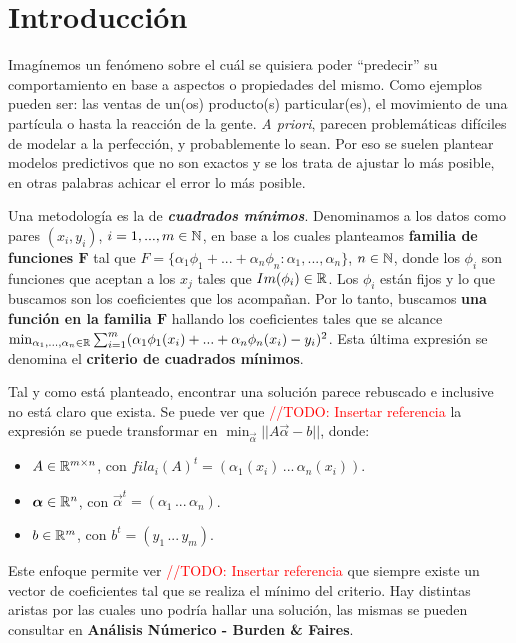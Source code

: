\section{Introducci\'on}\label{intro}

Imag\'inemos un fen\'omeno sobre el cu\'al se quisiera poder ``predecir'' su comportamiento en base a aspectos o propiedades del mismo. Como ejemplos pueden ser: las ventas de un(os) producto(s) particular(es), el movimiento de una part\'icula o hasta la reacci\'on de la gente. \textit{A priori}, parecen problem\'aticas dif\'iciles de modelar a la perfecci\'on, y probablemente lo sean. Por eso se suelen plantear modelos predictivos que no son exactos y se los trata de ajustar lo m\'as posible, en otras palabras achicar el error lo m\'as posible.

Una metodolog\'ia es la de \textbf{\textit{cuadrados m\'inimos}}. Denominamos a los datos como pares $(x_i, y_i)$, $i = 1, ..., m \in {\mathbb N}$, en base a los cuales planteamos \textbf{familia de funciones $\mathbf{F}$} tal que $F = \{\alpha_1\phi_1 + ... + \alpha_n\phi_n : \alpha_1, ..., \alpha_n\}$, $n \in {\mathbb N}$, donde los $\phi_i$ son funciones que aceptan a los $x_j$ tales que $Im(\phi_i) \in {\mathbb R}$. Los $\phi_i$ est\'an fijos y lo que buscamos son los coeficientes que los acompa\~nan. Por lo tanto, buscamos \textbf{una funci\'on en la familia $\mathbf{F}$} hallando los coeficientes tales que se alcance $\min_{\alpha_1, ..., \alpha_n \in {\mathbb R}} \sum_{i = 1}^{m} (\alpha_1\phi_1(x_i) + ... + \alpha_n\phi_n(x_i) - y_i)^{2}$. Esta \'ultima expresi\'on se denomina el \textbf{criterio de cuadrados m\'inimos}.

Tal y como est\'a planteado, encontrar una soluci\'on parece rebuscado e inclusive no est\'a claro que exista. Se puede ver que \textcolor{red}{//TODO: Insertar referencia} la expresi\'on se puede transformar en $\min_{\vec{\alpha}}||A\vec{\alpha} - b||$, donde:

\begin{itemize}
\item $A \in {\mathbb R}^{m \times n}$, con $fila_i(A)^{t} = (\alpha_1(x_i) \, ... \, \alpha_n(x_i))$.
\item $\vec{\alpha} \in \Real^{n}$, con $\vec{\alpha}^{t} = (\alpha_1 \, ... \, \alpha_n)$.
\item $b \in {\mathbb R}^{m}$, con $b^{t} = (y_1 \, ... \, y_m)$.
\end{itemize}

Este enfoque permite ver \textcolor{red}{//TODO: Insertar referencia} que siempre existe un vector de coeficientes tal que se realiza el m\'inimo del criterio. Hay distintas aristas por las cuales uno podr\'ia hallar una soluci\'on, las mismas se pueden consultar en \textbf{An\'alisis N\'umerico - Burden \& Faires}.

